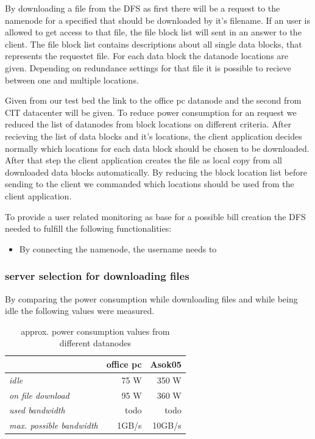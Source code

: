 By downloading a file from the DFS as first there will be a request to the namenode for a specified that should be downloaded by it's filename. If an user is allowed to get access to that file, the file block list will sent in an answer to the client. The file block list contains descriptions about all single data blocks, that represents the requestet file. For each data block the datanode locations are given. Depending on redundance settings for that file it is possible to recieve between one and multiple locations. 

Given from our test bed the link to the office pc datanode and the second from CIT datacenter will be given. To reduce power consumption for an request we reduced the list of datanodes from block locations on different criteria. After recieving the list of data blocks and it's locations, the client application decides normally which locations for each data block should be chosen to be downloaded. After that step the client application creates the file as local copy from all downloaded data blocks automatically. By reducing the block location list before sending to the client we commanded which locations should be used from the client application.

To provide a user related monitoring as base for a possible bill creation the DFS needed to fulfill the following functionalities:

\begin{itemize}
	\item By connecting the namenode, the username needs to 
\end{itemize}

\subsubsection{server selection for downloading files}

By comparing the power consumption while downloading files and while being idle the following values were measured.

\begin{table}
	\centering
	\caption{approx. power consumption values from different datanodes}	
	\begin{tabular}{|l|r|r|}
		\hline \rule[-2ex]{0pt}{5.5ex}  & \textbf{office pc} & \textbf{Asok05} \\ 
		\hline \rule[-2ex]{0pt}{5.5ex} \textit{idle} &   75 W &   350 W \\ 
		\hline \rule[-2ex]{0pt}{5.5ex} \textit{on file download} &   95 W &   360 W \\ 
		\hline \rule[-2ex]{0pt}{5.5ex} \textit{used bandwidth} & todo & todo \\
		\hline \rule[-2ex]{0pt}{5.5ex} \textit{max. possible bandwidth} & 1GB/s & 10GB/s \\
		\hline
	\end{tabular} 
	\label{tab:powerconsumptionvalues}
\end{table}

